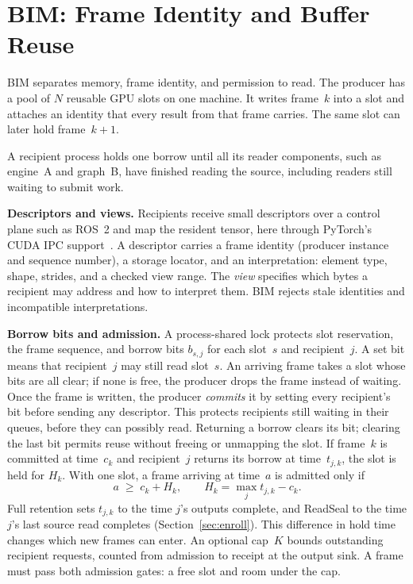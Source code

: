 \documentclass[conference]{IEEEtran}
\begin{document}
\section{BIM: Frame Identity and Buffer Reuse}
\label{sec:bim}

BIM separates memory, frame identity, and permission to read. The producer has a pool of $N$ reusable GPU slots on one machine. It writes frame~$k$ into a slot and attaches an identity that every result from that frame carries. The same slot can later hold frame~$k{+}1$.

A recipient process holds one borrow until all its reader components, such as engine~A and graph~B, have finished reading the source, including readers still waiting to submit work.

\textbf{Descriptors and views.} Recipients receive small descriptors over a control plane such as ROS~2 and map the resident tensor, here through PyTorch's CUDA IPC support~\cite{torchmp}. A descriptor carries a frame identity (producer instance and sequence number), a storage locator, and an interpretation: element type, shape, strides, and a checked view range. The \emph{view} specifies which bytes a recipient may address and how to interpret them. BIM rejects stale identities and incompatible interpretations.

\textbf{Borrow bits and admission.} A process-shared lock protects slot reservation, the frame sequence, and borrow bits $b_{s,j}$ for each slot~$s$ and recipient~$j$. A set bit means that recipient~$j$ may still read slot~$s$. An arriving frame takes a slot whose bits are all clear; if none is free, the producer drops the frame instead of waiting. Once the frame is written, the producer \emph{commits} it by setting every recipient's bit before sending any descriptor. This protects recipients still waiting in their queues, before they can possibly read. Returning a borrow clears its bit; clearing the last bit permits reuse without freeing or unmapping the slot. If frame~$k$ is committed at time~$c_k$ and recipient~$j$ returns its borrow at time~$t_{j,k}$, the slot is held for $H_k$. With one slot, a frame arriving at time~$a$ is admitted only if
\begin{equation}
a\;\ge\; c_k+H_k, \qquad H_k=\max_j t_{j,k}-c_k. \label{eq:hold}
\end{equation}
Full retention sets $t_{j,k}$ to the time $j$'s outputs complete, and ReadSeal to the time $j$'s last source read completes (Section~\ref{sec:enroll}). This difference in hold time changes which new frames can enter. An optional cap~$K$ bounds outstanding recipient requests, counted from admission to receipt at the output sink. A frame must pass both admission gates: a free slot and room under the cap.
\end{document}
